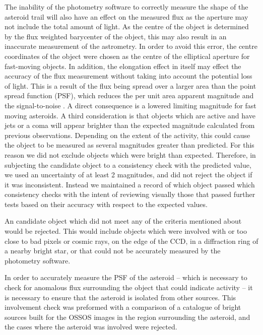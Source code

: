 \documentclass[iop,apj]{emulateapj}
\begin{document}
The inability of the photometry software to correctly measure the shape of the asteroid trail will also have an effect on the measured flux as the aperture may not include the total amount of light. As the centre of the object is determined by the flux weighted barycenter of the object, this may also result in an inaccurate measurement of the astrometry. In order to avoid this error, the centre coordinates of the object were chosen as the centre of the elliptical aperture for fast-moving objects. 
In addition, the elongation effect in itself may effect the accuracy of the flux measurement without taking into account the potential loss of light. This is a result of the flux being spread over a larger area than the point spread function (PSF), which reduces the per unit area apparent magnitude and the signal-to-noise \citep{veres12}. A direct consequence is a lowered limiting magnitude for fast moving asteroids. 
A third consideration is that objects which are active and have jets or a coma will appear brighter than the expected magnitude calculated from previous observations. Depending on the extent of the activity, this could cause the object to be measured as several magnitudes greater than predicted. For this reason we did not exclude objects which were bright than expected.  
Therefore, in subjecting the candidate object to a consistency check with the predicted value, we used an uncertainty of at least 2 magnitudes, and did not reject the object if it was inconsistent. Instead we maintained a record of which object passed which consistency checks with the intent of reviewing visually those that passed further tests based on their accuracy with respect to the expected values. 
 
An candidate object which did not meet any of the criteria mentioned about would be rejected. This would include objects which were involved with or too close to bad pixels or cosmic rays, on the edge of the CCD, in a diffraction ring of a nearby bright star, or that could not be accurately measured by the photometry software.

In order to accurately measure the PSF of the asteroid -- which is necessary to check for anomalous flux surrounding the object that could indicate activity -- it is necessary to ensure that the asteroid is isolated from other sources. This involvement check was preformed with a comparison of a catalogue of bright sources built for the OSSOS images \citep{ossos} in the region surrounding the asteroid, and the cases where the asteroid was involved were rejected.
\end{document}
